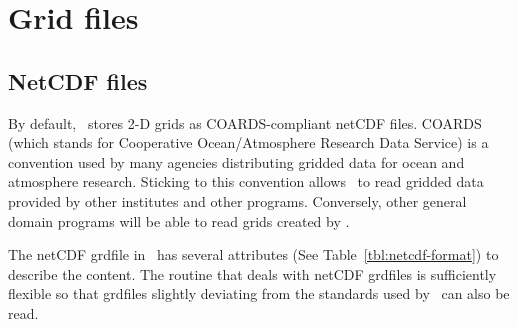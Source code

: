 \section{Grid files} 

\subsection{NetCDF files}

By default, \GMT\ stores 2-D grids as COARDS-compliant netCDF files.
COARDS (which stands for Cooperative Ocean/Atmosphere Research Data Service) is a convention used by
many agencies distributing gridded data for ocean and atmosphere research. Sticking to
this convention allows \GMT\ to read gridded data provided by other institutes
and other programs. Conversely, other general domain programs
will be able to read grids created by \GMT.

The netCDF grdfile in \GMT\ has several attributes (See Table~\ref{tbl:netcdf-format})
to describe the content. The routine
that deals with netCDF grdfiles is sufficiently flexible so that grdfiles slightly deviating
from the standards used by \GMT\ can also be read.

